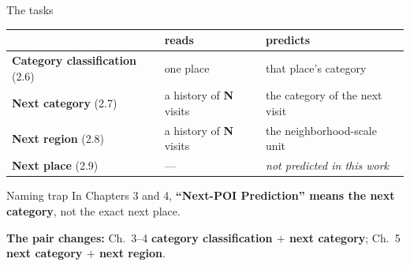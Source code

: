 \documentclass{beamer}
\begin{document}
\begin{frame}{The tasks}
    \vspace{0.5mm}
    {\small\renewcommand{\arraystretch}{1.35}\centering
    \begin{tabular}{@{}lll@{}}
        \toprule
         & \textbf{reads} & \textbf{predicts} \\
        \midrule
        \textbf{Category classification} (2.6) & one place                      & that place's category \\
        \textbf{Next category} (2.7)           & a history of \textbf{N} visits & the category of the next visit \\
        \textbf{Next region} (2.8)             & a history of \textbf{N} visits & the neighborhood-scale unit \\
        \textbf{Next place} (2.9)              & ---                            & \textit{not predicted in this work} \\
        \bottomrule
    \end{tabular}\par}

    \vspace{2mm}
    \begin{alertblock}{Naming trap}
        In Chapters 3 and 4, \textbf{``Next-POI Prediction'' means the next category}, not the exact next place.
    \end{alertblock}

    \vspace{1mm}
    {\footnotesize \textbf{The pair changes:} Ch.~3--4 \textbf{category classification $+$ next
     category}; Ch.~5 \textbf{next category $+$ next region}.\par}
\end{frame}
\end{document}
